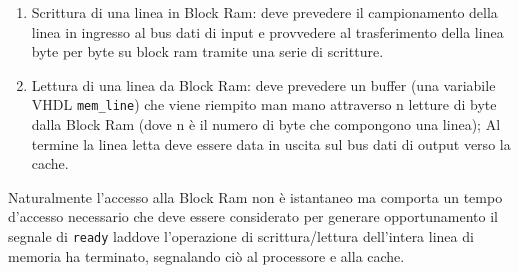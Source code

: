 \begin{enumerate}
\item Scrittura di una linea in Block Ram: deve prevedere il campionamento della linea in ingresso al bus dati di input e provvedere al trasferimento della linea byte per byte su block ram tramite una serie di scritture.
\item Lettura di una linea da Block Ram: deve prevedere un buffer (una variabile VHDL \texttt{mem\_line}) che viene riempito man mano attraverso n letture di byte dalla Block Ram (dove n \`e il numero di byte che compongono una linea); Al termine la linea letta deve essere data in uscita sul bus dati di output verso la cache.
\end{enumerate}

Naturalmente l'accesso alla Block Ram non \`e istantaneo ma comporta un tempo d'accesso necessario che deve essere considerato per generare opportunamento il segnale di \texttt{ready} laddove l'operazione di scrittura/lettura dell'intera linea di memoria ha terminato, segnalando ci\`o al processore e alla cache.



